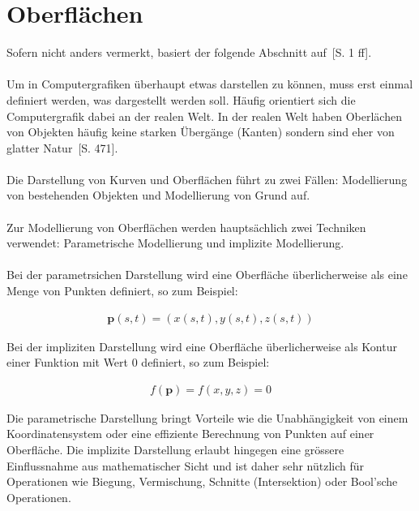 
\section{Oberflächen}
\label{sec:surfaces}

Sofern nicht anders vermerkt, basiert der folgende Abschnitt
auf~\cite{division_introduction_1996}[S. 1 ff].\\
\\
Um in Computergrafiken überhaupt etwas darstellen zu können, muss erst einmal
definiert werden, was dargestellt werden soll. Häufig orientiert sich die
Computergrafik dabei an der realen Welt.  In der realen Welt haben Oberlächen
von Objekten häufig keine starken Übergänge (Kanten) sondern sind eher von
glatter Natur~\cite{foley_computer_1996}[S. 471].\\
\\
Die Darstellung von Kurven und Oberflächen führt zu zwei Fällen: Modellierung
von bestehenden Objekten und Modellierung von Grund auf.\\
\\
Zur Modellierung von Oberflächen werden hauptsächlich zwei Techniken verwendet:
Parametrische Modellierung und implizite Modellierung.\\
\\
Bei der parametrsichen Darstellung wird eine Oberfläche überlicherweise als
eine Menge von Punkten definiert, so zum Beispiel:

\begin{gather}\label{eq:surface_parametric}
    \bm{p}(s, t) = (x(s, t), y(s, t), z(s, t))
\end{gather}

Bei der impliziten Darstellung wird eine Oberfläche überlicherweise als Kontur
einer Funktion mit Wert 0 definiert, so zum Beispiel:

\begin{gather}\label{eq:surface_implicit}
    f(\bm{p}) = f(x, y, z) = 0
\end{gather}

Die parametrische Darstellung bringt Vorteile wie die Unabhängigkeit von einem
Koordinatensystem oder eine effiziente Berechnung von Punkten auf einer
Oberfläche. Die implizite Darstellung erlaubt hingegen eine grössere
Einflussnahme aus mathematischer Sicht und ist daher sehr nützlich für
Operationen wie Biegung, Vermischung, Schnitte (Intersektion) oder Bool'sche
Operationen.


